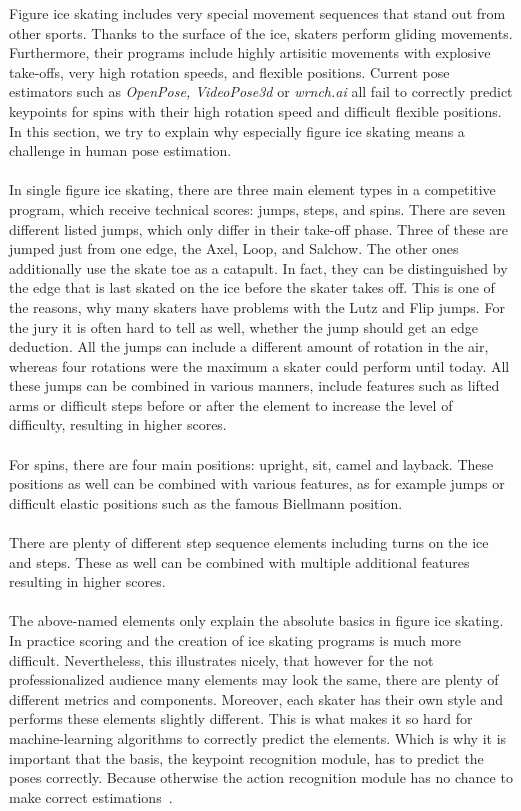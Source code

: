 Figure ice skating includes very special movement sequences that stand out from other sports.
Thanks to the surface of the ice, skaters perform gliding movements.
Furthermore, their programs include highly artisitic
movements with explosive take-offs, very high rotation speeds, and flexible positions.
Current pose estimators such as \textit{OpenPose, VideoPose3d} or \textit{wrnch.ai} all fail to correctly predict keypoints
for spins with their high
rotation speed and difficult flexible positions.
In this section, we try to explain why especially figure ice skating means a challenge in human pose estimation.
\\\mbox{}\\
In single figure ice skating, there are three main element types in a competitive program, which receive
technical scores:
jumps, steps, and spins.
There are seven different listed jumps, which only differ in their take-off phase.
Three
of these
are jumped just from one edge, the Axel, Loop, and Salchow.
The other ones additionally use the skate toe as a catapult.
In fact, they can be distinguished by the edge that is last skated on the ice before the skater takes off.
This is one of the reasons, why many skaters have problems with the Lutz and Flip jumps.
For the jury it is often hard to tell as well, whether the jump should get an edge deduction.
All the jumps can include a different amount of rotation in the air,
whereas four rotations were the maximum a skater could perform until today.
All these jumps can be combined in various manners, include features such as lifted arms or difficult steps
before or after the element to
increase the level of difficulty, resulting in higher scores.
\\\mbox{}\\
For spins, there are four main positions: upright, sit, camel and layback.
These positions as well can be combined with various features, as for example jumps or difficult elastic positions
such as the famous Biellmann position.
\\\mbox{}\\
There are plenty of different step sequence elements including turns on the ice and steps.
These as well can be combined with multiple additional features resulting in higher scores.
\\\mbox{}\\
The above-named elements only explain the absolute basics in figure ice skating.
In practice scoring and the
creation of ice skating
programs is much more difficult.
Nevertheless, this illustrates nicely, that however for the not professionalized
audience many elements may
look the same, there are plenty of different metrics and components.
Moreover, each skater has their own style
and performs these elements
slightly different.
This is what makes it so hard for machine-learning algorithms to correctly predict the elements.
Which is
why it is important that
the basis, the keypoint recognition module, has to predict the poses correctly.
Because otherwise the action
recognition module has no
chance to make correct estimations~\cite{isuguideleinesgoe, isujudginssystem}.

